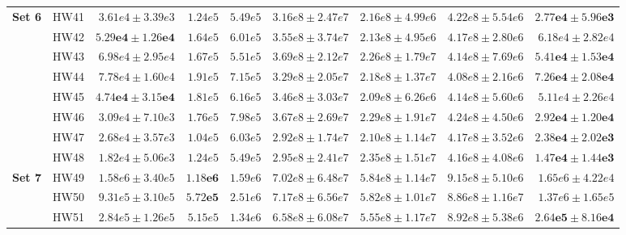 \documentclass[11pt]{article}
\begin{document}
{\begin{table}
\begin{tabular}{l|r|r|r|r|r|r|r|r}
\multirow{8}{*}{\textbf{Set 6}}
& HW41 & $3.61e4 \pm 3.39e3$ & $1.24e5$ & $5.49e5$
& $3.16e8 \pm 2.47e7$ & $2.16e8 \pm 4.99e6$
& $4.22e8 \pm 5.54e6$ & $\mathbf{2.77e4 \pm 5.96e3}$ \\

& HW42 & $\mathbf{5.29e4 \pm 1.26e4}$ & $1.64e5$ & $6.01e5$
& $3.55e8 \pm 3.74e7$ & $2.13e8 \pm 4.95e6$
& $4.17e8 \pm 2.80e6$ & $6.18e4 \pm 2.82e4$ \\

& HW43 & $6.98e4 \pm 2.95e4$ & $1.67e5$ & $5.51e5$
& $3.69e8 \pm 2.12e7$ & $2.26e8 \pm 1.79e7$
& $4.14e8 \pm 7.69e6$ & $\mathbf{5.41e4 \pm 1.53e4}$ \\

& HW44 & $7.78e4 \pm 1.60e4$ & $1.91e5$ & $7.15e5$
& $3.29e8 \pm 2.05e7$ & $2.18e8 \pm 1.37e7$
& $4.08e8 \pm 2.16e6$ & $\mathbf{7.26e4 \pm 2.08e4}$ \\

& HW45 & $\mathbf{4.74e4 \pm 3.15e4}$ & $1.81e5$ & $6.16e5$
& $3.46e8 \pm 3.03e7$ & $2.09e8 \pm 6.26e6$
& $4.14e8 \pm 5.60e6$ & $5.11e4 \pm 2.26e4$ \\

& HW46 & $3.09e4 \pm 7.10e3$ & $1.76e5$ & $7.98e5$
& $3.67e8 \pm 2.69e7$ & $2.29e8 \pm 1.91e7$
& $4.24e8 \pm 4.50e6$ & $\mathbf{2.92e4 \pm 1.20e4}$ \\

& HW47 & $2.68e4 \pm 3.57e3$ & $1.04e5$ & $6.03e5$
& $2.92e8 \pm 1.74e7$ & $2.10e8 \pm 1.14e7$
& $4.17e8 \pm 3.52e6$ & $\mathbf{2.38e4 \pm 2.02e3}$ \\

& HW48 & $1.82e4 \pm 5.06e3$ & $1.24e5$ & $5.49e5$
& $2.95e8 \pm 2.41e7$ & $2.35e8 \pm 1.51e7$
& $4.16e8 \pm 4.08e6$ & $\mathbf{1.47e4 \pm 1.44e3}$ \\
\hline

\multirow{8}{*}{\textbf{Set 7}}
& HW49 & $1.58e6 \pm 3.40e5$ & $\mathbf{1.18e6}$ & $1.59e6$
& $7.02e8 \pm 6.48e7$ & $5.84e8 \pm 1.14e7$
& $9.15e8 \pm 5.10e6$ & $1.65e6 \pm 4.22e4$ \\

& HW50 & $9.31e5 \pm 3.10e5$ & $\mathbf{5.72e5}$ & $2.51e6$
& $7.17e8 \pm 6.56e7$ & $5.82e8 \pm 1.01e7$
& $8.86e8 \pm 1.16e7$ & $1.37e6 \pm 1.65e5$ \\

& HW51 & $2.84e5 \pm 1.26e5$ & $5.15e5$ & $1.34e6$
& $6.58e8 \pm 6.08e7$ & $5.55e8 \pm 1.17e7$
& $8.92e8 \pm 5.38e6$ & $\mathbf{2.64e5 \pm 8.16e4}$ \\


\end{tabular}
\end{table}}
\end{document}
